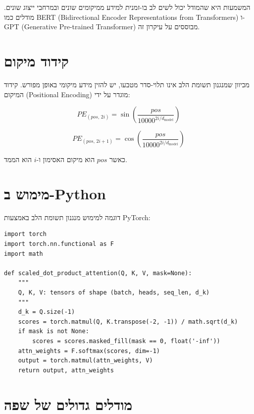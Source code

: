 המשמעות היא שהמודל יכול לשים לב בו-זמנית למידע ממיקומים שונים ובמרחבי ייצוג שונים.
מודלים כמו \textenglish{BERT} (\textenglish{Bidirectional Encoder Representations from Transformers})
ו-\textenglish{GPT} (\textenglish{Generative Pre-trained Transformer}) מבוססים על עיקרון זה.

\section{קידוד מיקום}

מכיוון שמנגנון תשומת הלב אינו תלוי-סדר מטבעו, יש להזין מידע מיקומי באופן מפורש.
קידוד המיקום (\textenglish{Positional Encoding}) מוגדר על ידי:

\begin{equation}
    PE_{(pos,\, 2i)}   = \sin\!\left(\frac{pos}{10000^{2i/d_{\text{model}}}}\right)
\end{equation}

\begin{equation}
    PE_{(pos,\, 2i+1)} = \cos\!\left(\frac{pos}{10000^{2i/d_{\text{model}}}}\right)
\end{equation}

כאשר \(pos\) הוא מיקום האסימון ו-\(i\) הוא הממד.

\section{מימוש ב-\textenglish{Python}}

דוגמה למימוש מנגנון תשומת הלב באמצעות \textenglish{PyTorch}:

\begin{LTR}
\begin{verbatim}
import torch
import torch.nn.functional as F
import math

def scaled_dot_product_attention(Q, K, V, mask=None):
    """
    Q, K, V: tensors of shape (batch, heads, seq_len, d_k)
    """
    d_k = Q.size(-1)
    scores = torch.matmul(Q, K.transpose(-2, -1)) / math.sqrt(d_k)
    if mask is not None:
        scores = scores.masked_fill(mask == 0, float('-inf'))
    attn_weights = F.softmax(scores, dim=-1)
    output = torch.matmul(attn_weights, V)
    return output, attn_weights
\end{verbatim}
\end{LTR}

\section{מודלים גדולים של שפה}

